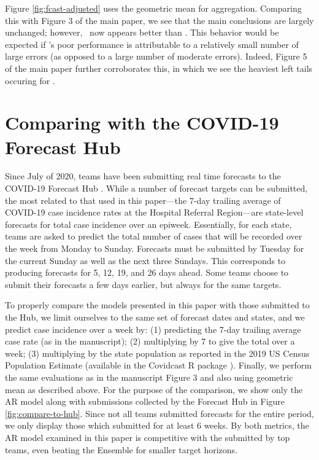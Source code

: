 Figure \ref{fig:fcast-adjusted} uses the geometric mean for aggregation.
Comparing this with Figure 3 of the main paper, we see that the main conclusions
are largely unchanged; however, \chngcli~now appears better than \ar.  This
behavior would be expected if \chngcli's poor performance is attributable to a
relatively small number of large errors (as opposed to a large number of
moderate errors).  Indeed, Figure 5 of the main paper further corroborates this,
in which we see the heaviest left tails occuring for \chngcli.

\section{Comparing with the COVID-19 Forecast Hub}

Since July of 2020, teams have been submitting real time forecasts
to the COVID-19 Forecast Hub \cite{ForecastHub}. While a number of forecast
targets can be submitted, the most related to that used in this paper---the
7-day trailing average of COVID-19 case incidence rates at the Hospital Referral
Region---are state-level forecasts for total case incidence over an epiweek.
Essentially, for each state, teams are asked to predict the total number of
cases that will be recorded over the week from Monday to Sunday. Forecasts must
be submitted by Tuesday for the current Sunday as well as the next three
Sundays. This corresponds to producing forecasts for 5, 12, 19, and 26 days
ahead. Some teams choose to submit their forecasts a few days earlier, but
always for the same targets.

To properly compare the models presented in this paper with those submitted to
the Hub, we limit ourselves to the same set of forecast dates and states, and
we predict case incidence over a week by: (1) predicting the 7-day trailing
average case rate (as in the manuscript);
(2) multiplying by 7 to give the total over a week; (3) multiplying by the state
population as reported in the 2019 US Census Population Estimate (available in
the Covidcast R package \cite{CovidcastR}). Finally, we perform the same
evaluations as in the manuscript Figure 3 and also using geometric mean as
described above.
For the purpose of the comparison, we show only the AR model along with
submissions collected by the Forecast Hub in Figure \ref{fig:compare-to-hub}.
Since not all teams submitted forecasts for the entire period, we
only display those which submitted for at least 6 weeks. By both metrics,
the AR model examined in this paper is competitive with the submitted by top teams, even
beating the Ensemble for smaller target horizons.



